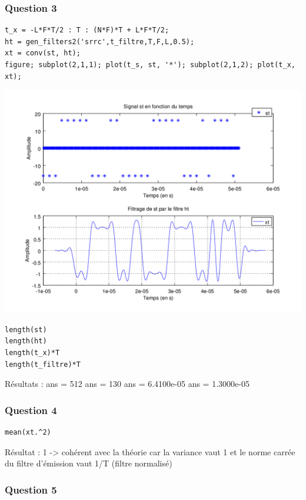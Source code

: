\documentclass{acm_proc_article-sp}
\begin{document}
\subsubsection{Question 3}
\begin{lstlisting}
t_x = -L*F*T/2 : T : (N*F)*T + L*F*T/2;
ht = gen_filters2('srrc',t_filtre,T,F,L,0.5);
xt = conv(st, ht);
figure; subplot(2,1,1); plot(t_s, st, '*'); subplot(2,1,2); plot(t_x, xt);
\end{lstlisting}

\begin{center}
\includegraphics[scale=0.45]{conv_3_3.png}
\end{center}

\begin{lstlisting}
length(st)
length(ht)
length(t_x)*T
length(t_filtre)*T
\end{lstlisting}

Résultats : ans =  512
ans =  130
ans =    6.4100e-05
ans =    1.3000e-05

\subsubsection{Question 4}
\begin{lstlisting}
mean(xt.^2)
\end{lstlisting}

Résultat : 1 -> cohérent avec la théorie car la variance vaut 1 et le norme carrée du filtre d'émission vaut 1/T (filtre normalisé)

\subsubsection{Question 5}
\end{document}
